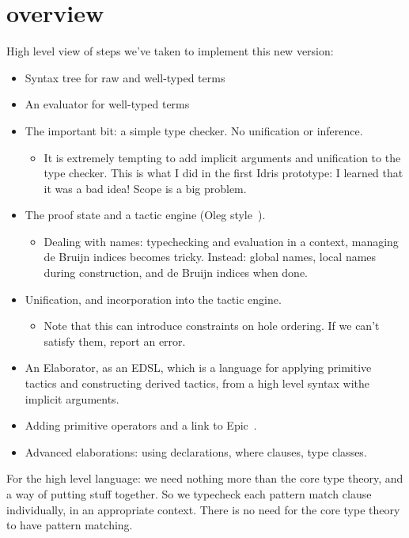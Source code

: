 \section{overview}

High level view of steps we've taken to implement this new version:

\begin{itemize}
\item Syntax tree for raw and well-typed terms
\item An evaluator for well-typed terms
\item The important bit: a simple type checker. No unification or
  inference.
\begin{itemize}
  \item It is extremely tempting to add implicit arguments and unification to the
        type checker. This is what I did in the first Idris prototype: I learned
        that it was a bad idea! Scope is a big problem.
\end{itemize}
\item The proof state and a tactic engine (Oleg style~\cite{mcbride-thesis}).
\begin{itemize}
  \item Dealing with names: typechecking and evaluation in a context, managing de Bruijn
        indices becomes tricky. Instead: global names, local names during construction,
        and de Bruijn indices when done.
\end{itemize}
\item Unification, and incorporation into the tactic engine.
\begin{itemize}
  \item Note that this can introduce constraints on hole ordering. If we can't satisfy them,
        report an error.
\end{itemize}
\item An Elaborator, as an EDSL, which is a language for applying primitive tactics and
      constructing derived tactics, from a high level syntax withe implicit arguments.
\item Adding primitive operators and a link to Epic~\cite{epic-tfp}.
\item Advanced elaborations: using declarations, where clauses, type classes.
\end{itemize}

For the high level language: we need nothing more than the core type theory,
and a way of putting stuff together. So we typecheck each pattern match clause
individually, in an appropriate context. There is no need for the core type
theory to have pattern matching.

